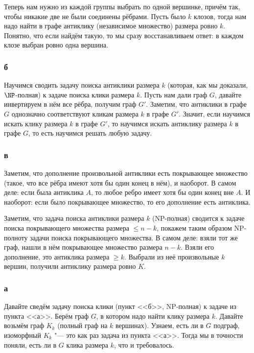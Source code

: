 		Теперь нам нужно из каждой группы выбрать по одной вершинке, причём так, чтобы никакие две не были соединены рёбрами.
		Пусть было $k$ клозов, тогда нам надо найти в графе антиклику (независимое множество) размера ровно $k$.
		Понятно, что если найдём такую, то мы сразу восстанавливаем ответ: в каждом клозе выбран ровно одна вершина.

	\subsubsection{б}
		Научимся сводить задачу поиска антиклики размера $k$ (которая, как мы доказали, $\NP$-полная) к задаче поиска клики размера $k$.
		Пусть нам дали граф $G$, давайте инвертируем в нём все рёбра, получим граф $G'$.
		Заметим, что антиклики в графе $G$ однозначно соответствуют кликам размера $k$ в графе $G'$.
		Значит, если научимся искать клику размера $k$ в графе $G'$, то научимся искать антиклику размера
		$k$ в графе $G$, то есть научимся решать любую задачу.

	\subsubsection{в}
		Заметим, что дополнение произвольной антиклики есть покрывающее множество (такое,
		что все рёбра имеют хотя бы один конец в нём), и наоборот.
		В самом деле: если была антиклика $A$, то любое ребро имеет хотя бы один конец вне $A$.
		И наоборот: если было покрывающее множество, то его дополнение есть антиклика.

		Заметим, что задача поиска антиклики размера $k$ (NP-полная) сводится к задаче поиска
		покрывающего множества размера $\le n-k$, покажем таким образом NP-полноту задачи
		поиска покрывающего множества.
		В самом деле: взяли тот же граф, нашли в нём покрывающее множество размера $n-k$.
		Взяли его дополнение, это антиклика размера $\ge k$.
		Выбрали из неё произвольные $k$ вершин, получили антиклику размера ровно $K$.

	\subsubsection{а}
		Давайте сведём задачу поиска клики (пункт <<б>>, NP-полная) к задаче из пункта <<а>>.
		Берём граф $G$, в котором надо найти клику размера $k$.
		Давайте возьмём граф $K_k$ (полный граф на $k$ вершинах).
		Узнаем, есть ли в $G$ подграф, изоморфный $K_k$ "--- это как раз задача из пункта <<а>>.
		Тогда мы в точности поняли, есть ли в $G$ клика размера $k$, что и требовалось.

